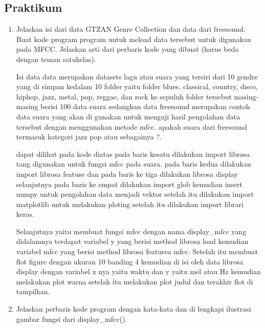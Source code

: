 \subsection{Praktikum}
\begin{enumerate}
\item Jelaskan isi dari data GTZAN Genre Collection dan data dari freesound. Buat kode program program untuk meload data tersebut untuk digunakan pada MFCC. Jelaskan arti dari perbaris kode yang dibuat (harus beda dengan teman satukelas).\par
\subitem Isi data data merupakan datasets lagu atau suara yang tersiri dari 10 gendre yang di simpan kedalam 10 folder yaitu folder blues, classical, country, disco, hiphop, jazz, metal, pop, reggae, dan rock ke sepuluh folder tersebut masing-masing  berisi 100 data suara sedangkan data freesound merupakan contoh data suara yang akan di gunakan untuk menguji hasil pengolahan data tersebut dengan menggunakan metode mfcc. apakah suara dari freesound termasuk kategori jazz pop atau sebagainya ?.



\subitem dapat dilihat pada kode diatas pada baris kesatu dilakukan import librosa tang digunakan untuk fungsi mfcc pada suara.
pada baris kedua dilakukan import librosa featuse dan pada baris ke tiga dilakukan librosa display selanjutnya pada baris ke empat dilakukan import glob kemudian insert numpy untuk pengolahan data menjadi vektor setelah itu dilakukan import matplotlib untuk melakukan ploting setelah itu dilakukan import librari keras.\par

\subitem Selanjutnya yaitu membuat fungsi mfcc dengan nama display\_mfcc yang didalamnya terdapat variabel y yang berisi method librosa load kemudian variabel mfcc yang berisi method librosa featurea mfcc. Setelah itu membuat flot figure dengan ukuran 10 banding 4 kemudian di isi oleh data librosa display dengan variabel x nya yaitu waktu dan y yaitu mel atau Hz kemudian melakukan plot warna setelah itu melakukan plot judul dan terakhir flot di tampilkan. 

\item Jelaskan perbaris kode program dengan kata-kata dan di lengkapi ilustrasi gambar fungsi dari display\_mfcc().\par




\end{enumerate}
